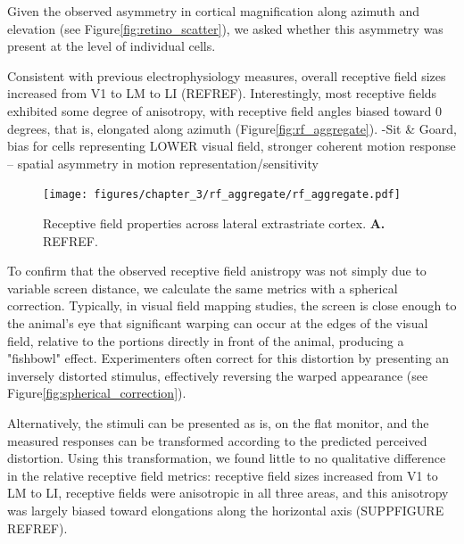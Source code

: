 Given the observed asymmetry in cortical magnification along azimuth and elevation (see Figure\ref{fig:retino_scatter}), we asked whether this asymmetry was present at the level of individual cells. 

Consistent with previous electrophysiology measures\cite{Vermaercke2014, Tafazoli2017}, overall receptive field sizes increased from V1 to LM to LI (REFREF). Interestingly, most receptive fields exhibited some degree of anisotropy, with receptive field angles biased toward 0 degrees, that is, elongated along azimuth (Figure\ref{fig:rf_aggregate}). 
-Sit & Goard, bias for cells representing LOWER visual field, stronger coherent motion response -- spatial asymmetry in motion representation/sensitivity

\begin{figure}[t!]
    \texttt{[image: figures/chapter\_3/rf\_aggregate/rf\_aggregate.pdf]}
    \vspace{.1in}
    \caption[Receptive field properties]{Receptive field properties across lateral extrastriate cortex. \textbf{A.} REFREF.
    \label{fig:rf_examples}}
\end{figure}

To confirm that the observed receptive field anistropy was not simply due to variable screen distance, we calculate the same metrics with a spherical correction. Typically, in visual field mapping studies, the screen is close enough to the animal's eye that significant warping can occur at the edges of the visual field, relative to the portions directly in front of the animal, producing a "fishbowl" effect. Experimenters often correct for this distortion by presenting an inversely distorted stimulus, effectively reversing the warped appearance (see Figure\ref{fig:spherical_correction}). 

Alternatively, the stimuli can be presented as is, on the flat monitor, and the measured responses can be transformed according to the predicted perceived distortion. Using this transformation, we found little to no qualitative difference in the relative receptive field metrics:  receptive field sizes increased from V1 to LM to LI, receptive fields were anisotropic in all three areas, and this anisotropy was largely biased toward elongations along the horizontal axis (SUPPFIGURE REFREF).

